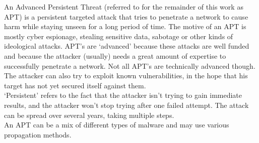 An Advanced Persistent Threat (referred to for the remainder of this work as APT) is a persistent targeted attack that tries to penetrate a network to cause harm while staying unseen for a long period of time. The motive of an APT is mostly cyber espionage, stealing sensitive data, sabotage or other kinds of ideological attacks. APT's are `advanced' because these attacks are well funded and because the attacker (usually) needs a great amount of expertise to successfully penetrate a network. Not all APT's are technically advanced though. The attacker can also try to exploit known vulnerabilities, in the hope that his target has not yet secured itself against them. \\
`Persistent' refers to the fact that the attacker isn't trying to gain immediate results, and the attacker won't stop trying after one failed attempt. The attack can be spread over several years, taking multiple steps.  \\
An APT can be a mix of different types of malware and may use various propagation methods. \\
%
%
%
%
%

